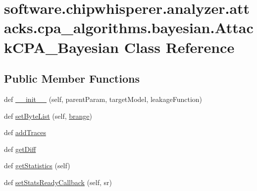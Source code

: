 \hypertarget{classsoftware_1_1chipwhisperer_1_1analyzer_1_1attacks_1_1cpa__algorithms_1_1bayesian_1_1AttackCPA__Bayesian}{}\section{software.\+chipwhisperer.\+analyzer.\+attacks.\+cpa\+\_\+algorithms.\+bayesian.\+Attack\+C\+P\+A\+\_\+\+Bayesian Class Reference}
\label{classsoftware_1_1chipwhisperer_1_1analyzer_1_1attacks_1_1cpa__algorithms_1_1bayesian_1_1AttackCPA__Bayesian}
\subsection*{Public Member Functions}
\begin{DoxyCompactItemize}
\item 
def \hyperlink{classsoftware_1_1chipwhisperer_1_1analyzer_1_1attacks_1_1cpa__algorithms_1_1bayesian_1_1AttackCPA__Bayesian_a138da4a3c8c5ecb15ee953cb03a8efa5}{\+\_\+\+\_\+init\+\_\+\+\_\+} (self, parent\+Param, target\+Model, leakage\+Function)
\item 
def \hyperlink{classsoftware_1_1chipwhisperer_1_1analyzer_1_1attacks_1_1cpa__algorithms_1_1bayesian_1_1AttackCPA__Bayesian_acd76397c87555939b99bf8241cbbb2e9}{set\+Byte\+List} (self, \hyperlink{classsoftware_1_1chipwhisperer_1_1analyzer_1_1attacks_1_1cpa__algorithms_1_1bayesian_1_1AttackCPA__Bayesian_af7bc6ec8a96232a156c4037e096d0b4f}{brange})
\item 
def \hyperlink{classsoftware_1_1chipwhisperer_1_1analyzer_1_1attacks_1_1cpa__algorithms_1_1bayesian_1_1AttackCPA__Bayesian_ab560b2b5293ea4f138fe12e4e0e7514f}{add\+Traces}
\item 
def \hyperlink{classsoftware_1_1chipwhisperer_1_1analyzer_1_1attacks_1_1cpa__algorithms_1_1bayesian_1_1AttackCPA__Bayesian_aac00c7a55e9309f8184b50711a59d718}{get\+Diff}
\item 
def \hyperlink{classsoftware_1_1chipwhisperer_1_1analyzer_1_1attacks_1_1cpa__algorithms_1_1bayesian_1_1AttackCPA__Bayesian_ad51fb8e59259fb3cc861637b8c3bca3b}{get\+Statistics} (self)
\item 
def \hyperlink{classsoftware_1_1chipwhisperer_1_1analyzer_1_1attacks_1_1cpa__algorithms_1_1bayesian_1_1AttackCPA__Bayesian_a1eaff29bd3550f77f31f985d207413f9}{set\+Stats\+Ready\+Callback} (self, sr)
\end{DoxyCompactItemize}
